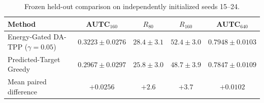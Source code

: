 \begin{table}[!htbp]
\centering
\caption{Frozen held-out comparison on independently initialized seeds 15--24.}
\label{tab:gamma005-holdout}
\small
\begin{tabular}{lcccc}
\toprule
Method & AUTC$_{160}$ & $R_{80}$ & $R_{160}$ & AUTC$_{640}$ \\
\midrule
Energy-Gated DA-TPP ($\gamma=0.05$) & $0.3223 \pm 0.0276$ & $28.4 \pm 3.1$ & $52.4 \pm 3.0$ & $0.7948 \pm 0.0103$ \\
Predicted-Target Greedy & $0.2967 \pm 0.0297$ & $25.8 \pm 3.0$ & $48.7 \pm 3.9$ & $0.7847 \pm 0.0109$ \\
Mean paired difference & $+0.0256$ & $+2.6$ & $+3.7$ & $+0.0102$ \\
\bottomrule
\end{tabular}
\end{table}
